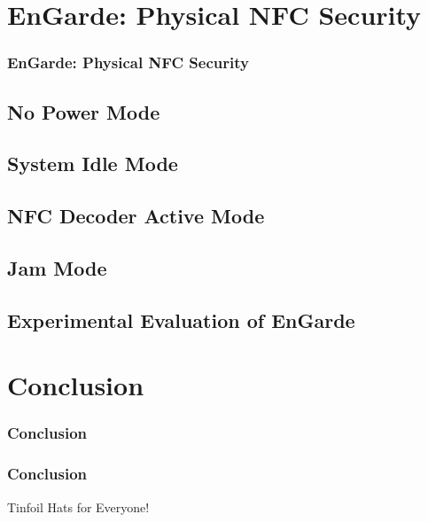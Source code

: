 \documentclass[unknownkeysallowed]{beamer}
\begin{document}
\section{EnGarde: Physical NFC Security}
\begin{frame}
\frametitle{EnGarde: Physical NFC Security}
\begin{center}\begin{minipage}{.9\textwidth}
\tableofcontents[currentsubsection, hideothersubsections, sectionstyle=show/shaded]
\end{minipage}\end{center}
\end{frame}
%

\subsection{No Power Mode}
\subsection{System Idle Mode}
\subsection{NFC Decoder Active Mode}
\subsection{Jam Mode}
\subsection{Experimental Evaluation of EnGarde}


\section{Conclusion}
\begin{frame}
\frametitle{Conclusion}
\begin{center}\begin{minipage}{.9\textwidth}
\tableofcontents[currentsubsection, hideothersubsections, sectionstyle=show/shaded]
\end{minipage}\end{center}
\end{frame}
%
\begin{frame}
  \frametitle{Conclusion}
  \begin{block}{Tinfoil Hats for Everyone!}
  \end{block}
\end{frame}
\end{document}
